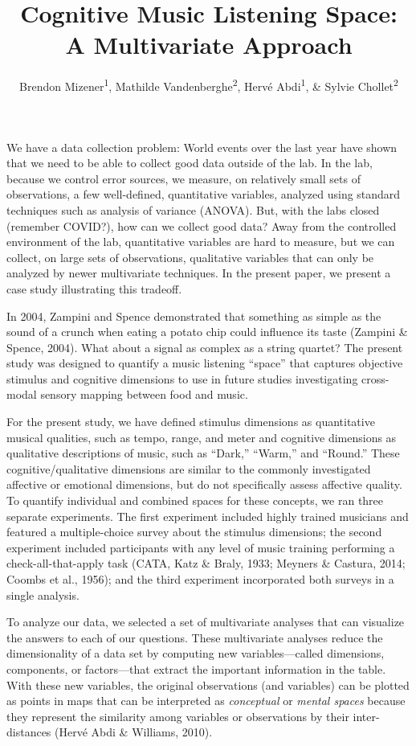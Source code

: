 \documentclass[
  english,
  man]{apa6}
\title{Cognitive Music Listening Space: A Multivariate Approach}
\author{Brendon Mizener\textsuperscript{1}, Mathilde Vandenberghe\textsuperscript{2}, Hervé Abdi\textsuperscript{1}, \& Sylvie Chollet\textsuperscript{2}}
\date{}
\affiliation{\vspace{0.5cm}\textsuperscript{1} University of Texas at Dallas\\\textsuperscript{2} Junia, Univ. Artois, Université de Liège, Univ. Littoral Côte d'Opale, UMRT 1158 BioEcoAgro, F-62000 Arras, France}
\begin{document}
\maketitle

We have a data collection problem: World events over the last year have shown that we need to be able to collect good data outside of the lab. In the lab, because we control error sources, we measure, on relatively small sets of observations, a few well-defined, quantitative variables, analyzed using standard techniques such as analysis of variance (ANOVA). But, with the labs closed (remember COVID?), how can we collect good data? Away from the controlled environment of the lab, quantitative variables are hard to measure, but we can collect, on large sets of observations, qualitative variables that can only be analyzed by newer multivariate techniques. In the present paper, we present a case study illustrating this tradeoff.

In 2004, Zampini and Spence demonstrated that something as simple as the sound of a crunch when eating a potato chip could influence its taste (Zampini \& Spence, 2004). What about a signal as complex as a string quartet? The present study was designed to quantify a music listening ``space'' that captures objective stimulus and cognitive dimensions to use in future studies investigating cross-modal sensory mapping between food and music.

For the present study, we have defined stimulus dimensions as quantitative musical qualities, such as tempo, range, and meter and cognitive dimensions as qualitative descriptions of music, such as ``Dark,'' ``Warm,'' and ``Round.'' These cognitive/qualitative dimensions are similar to the commonly investigated affective or emotional dimensions, but do not specifically assess affective quality. To quantify individual and combined spaces for these concepts, we ran three separate experiments. The first experiment included highly trained musicians and featured a multiple-choice survey about the stimulus dimensions; the second experiment included participants with any level of music training performing a check-all-that-apply task (CATA, Katz \& Braly, 1933; Meyners \& Castura, 2014; Coombs et al., 1956); and the third experiment incorporated both surveys in a single analysis.

To analyze our data, we selected a set of multivariate analyses that can visualize the answers to each of our questions. These multivariate analyses reduce the dimensionality of a data set by computing new variables---called dimensions, components, or factors---that extract the important information in the table. With these new variables, the original observations (and variables) can be plotted as points in maps that can be interpreted as \emph{conceptual} or \emph{mental spaces} because they represent the similarity among variables or observations by their inter-distances (Hervé Abdi \& Williams, 2010).
\end{document}
